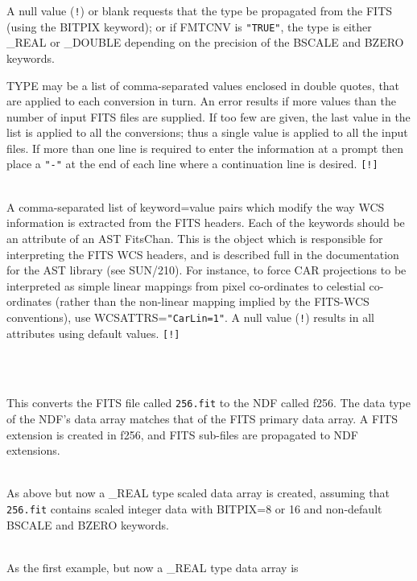 \documentclass[twoside,11pt]{article}
\newcommand{\htmlref}[2]{#1}
\newcommand{\xref}[3]{#1}
\newlength{\sstexampleslength}
\newcommand{\sstexamples}[1]{
   \goodbreak
   \item[Examples:] \mbox{} \\
   \vspace{-3.5ex}
   \begin{description}
      #1
   \end{description}
}
\newcommand{\sstsubsection}[1]{ \item[{#1}] \mbox{} \\}
\newcommand{\sstexamplesubsection}[2]{\sloppy
\item[\parbox{\sstexampleslength}{\ssttt #1}] \mbox{} \vspace{0.5ex}
\\ #2 \vspace{1.0ex}}
\newcommand{\sstexamples}[1]{
   \item[\vspace{0.35ex}\htmlref{Examples:\vspace{-0.5ex}}{app_example}]
      \begin{description}
         #1
      \end{description}
      \\
   }
\newcommand{\sstsubsection}[1]{\item[{#1}]}
\newcommand{\sstexamplesubsection}[2]{
   \vspace{-1.0ex} \item[{\ssttt #1}] #2 \vspace{0.2ex}}
\begin{document}
{{{         A null value (\texttt{!}) or blank requests that the type be
	 propagated from the FITS (using the BITPIX keyword); or if
	 FMTCNV is \texttt{"TRUE"}, the type is either \_REAL or \_DOUBLE
	 depending on the precision of the BSCALE and BZERO keywords.

         TYPE may be a list of comma-separated values enclosed in 
         double quotes, that are applied to each conversion in turn.  An
         error results if more values than the number of input FITS 
         files are supplied.  If too few are given, the last value in 
         the list is applied to all the conversions; thus a single value
         is applied to all the input files.  If more than one line is 
         required to enter the information at a prompt then place a
         \texttt{"-"} at the end of each line where a continuation line
         is desired.  \texttt{[!]}
      }
      \sstsubsection{
         WCSATTRS = LITERAL (Read)
      }{
         A comma-separated list of keyword=value pairs which modify the 
         way WCS information is extracted from the FITS headers. Each of
         the keywords should be an attribute of an AST FitsChan.  This 
         is the object which is responsible for interpreting the FITS
         WCS headers, and is described full in the documentation for the AST 
         library (see \xref{SUN/210}{sun210}{}).  For instance, to force 
         CAR projections to be interpreted as simple linear mappings from
         pixel co-ordinates to celestial co-ordinates (rather than the 
         non-linear mapping implied by the FITS-WCS conventions), use
         WCSATTRS=\texttt{"CarLin=1"}.  A null  value (\texttt{!}) 
         results in all attributes using default values. \texttt{[!]}
      }
   }
   \sstexamples{
      \sstexamplesubsection{
         fits2ndf 256.fit f256 fmtcnv=f
      }{
         This converts the FITS file called \texttt{256.fit} to the NDF called
         f256.  The data type of the NDF's data array matches that of
         the FITS primary data array.  A FITS extension is created in
         f256, and FITS sub-files are propagated to NDF extensions.
      }
      \sstexamplesubsection{
         fits2ndf 256.fit f256 fmtcnv=native type=\_real
      }{
         As above but now a \_REAL type scaled data array is created,
         assuming that {\tt 256.fit} contains scaled integer data with 
         BITPIX=8 or 16 and non-default BSCALE and BZERO keywords.
      }
      \sstexamplesubsection{
         fits2ndf 256.fit f256 fmtcnv=t type=\_real
      }{
         As the first example, but now a \_REAL type data array is 
}}}
\end{document}
